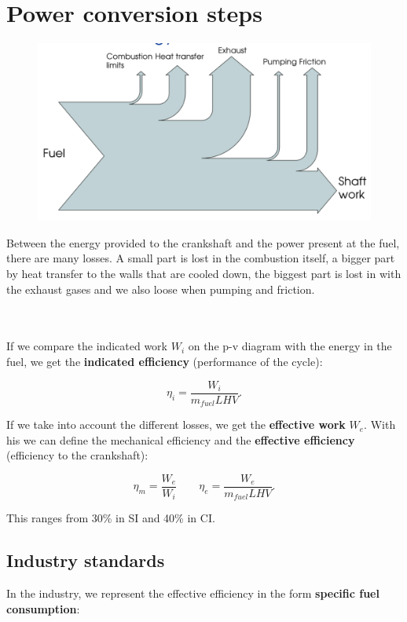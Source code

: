 \section{Power conversion steps}
	\begin{figure}
	\vspace{-5mm}
	\includegraphics[scale=0.3]{ch2/16}
	\label{fig:2.16}
	\end{figure}
	Between the energy provided to the crankshaft and the power present at the fuel, there are many losses. A small part is lost in the combustion itself, a bigger part by heat transfer to the walls that are cooled down, the biggest part is lost in with the exhaust gases and we also loose when pumping and friction.  
	
\ \\\\	If we compare the indicated work $W_i$ on the p-v diagram with the energy in the fuel, we get the \textbf{indicated efficiency} (performance of the cycle):
	
	\begin{equation}
	\eta _i = \frac{W_i}{m _{fuel} LHV}.
	\end{equation}
	
	If we take into account the different losses, we get the \textbf{effective work} $W_e$. With his we can define the mechanical efficiency and the \textbf{effective efficiency} (efficiency to the crankshaft):
	
	\begin{equation}
	\eta _m = \frac{W_e}{W_i} \qquad \eta _e = \frac{W_e}{m_{fuel} LHV}.
	\end{equation}
	
	This ranges from 30\% in SI and 40\% in CI.
	
\subsection{Industry standards}
	In the industry, we represent the effective efficiency in the form \textbf{specific fuel consumption}: 
	
